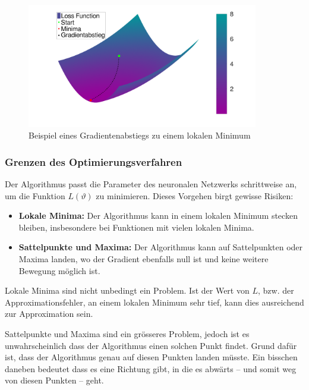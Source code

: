 \begin{figure}
    \centering
    \hspace*{-0.1\textwidth}
    \includegraphics[width=0.9\textwidth]{papers/neuronal/images/gd_close_to_minima_long_distances_with_line.png}
    \caption{Beispiel eines Gradientenabstiegs zu einem lokalen Minimum}
    \label{fig:gradientenabstieg_beispiel}
\end{figure}


\subsubsection{Grenzen des Optimierungsverfahren}\label{neuronal:subsubsection:optimierungsverfahren_grenzen}

Der Algorithmus passt die Parameter des neuronalen Netzwerks schrittweise an, um die Funktion \( L(\vartheta) \) zu minimieren. 
Dieses Vorgehen birgt gewisse Risiken:
\begin{itemize}
    \item \textbf{Lokale Minima:} Der Algorithmus kann in einem lokalen Minimum stecken bleiben, insbesondere bei Funktionen mit vielen lokalen Minima.
    \item \textbf{Sattelpunkte und Maxima:} Der Algorithmus kann auf Sattelpunkten oder Maxima landen, wo der Gradient ebenfalls null ist und keine weitere Bewegung möglich ist.
\end{itemize}

Lokale Minima sind nicht unbedingt ein Problem. 
Ist der Wert von $L$, bzw. der Approximationsfehler, an einem lokalen Minimum sehr tief, kann dies ausreichend zur Approximation sein.

Sattelpunkte und Maxima sind ein grösseres Problem, jedoch ist es unwahrscheinlich dass der Algorithmus einen solchen Punkt findet.
Grund dafür ist, dass der Algorithmus genau auf diesen Punkten landen müsste.
Ein bisschen daneben bedeutet dass es eine Richtung gibt, in die es abwärts -- und somit weg von diesen Punkten -- geht.

